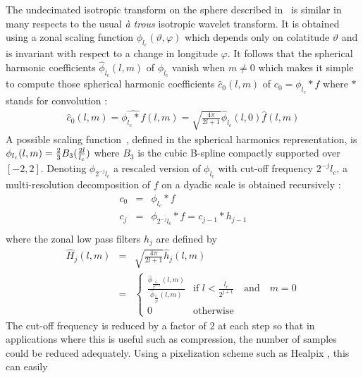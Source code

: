 The undecimated isotropic transform on the sphere described in~\cite{starck:sta05_2} is similar in many respects to the usual 
\emph{ \`a trous} isotropic wavelet transform. It is obtained using a zonal scaling function $\phi_{l_c}(\vartheta, \varphi)$ 
which depends only on colatitude $\vartheta$ and is invariant with respect to a change in longitude $\varphi$. It follows that 
the spherical harmonic coefficients $\hat \phi_{l_c} (l,m)$ of $\phi_{l_c}$ vanish when $m \ne 0$ which makes it simple to compute 
those spherical harmonic coefficients $\hat c_{0}(l,m)$ of $c_0 = \phi_{l_c} * f$ where $*$ stands for convolution :
\begin{eqnarray}
 \hat c_{0}(l,m) = \widehat{\phi_{l_c} * f} (l,m) = \sqrt{\frac{4\pi}{2l+1} } \hat \phi_{l_c} (l,0) \hat f(l,m) 
\end{eqnarray}
A possible scaling function~\cite{starck:book98}, defined in the spherical harmonics representation, is $\phi_{l_c}(l, m) = {2 \over 3} B_{3} ( { {2 l} \over {l_{c} } } )$ 
where $B_{3}$ is the cubic B-spline compactly supported over $[-2, 2]$. Denoting $\phi_{2^{-j} l_{c} }$ a rescaled version of 
$\phi_{l_{c}}$ with cut-off frequency $2^{-j} l_{c}$, a multi-resolution decomposition of $f$ on a dyadic scale is obtained recursively : 
\begin{eqnarray}
c_0   & = &  \phi_{ l_{c} }  * f    \nonumber    \\
c_j    &=&   \phi_{2^{-j}  l_{c}  }  * f  =   c_{j-1} * h_{j-1} \nonumber    \\
\end{eqnarray}
where the zonal low pass filters $h_{j}$ are defined by 
\begin{eqnarray}
 \hat{H}_{j}(l,m)  & =  &  \sqrt{\frac{4\pi}{2l+1} }  \hat h_{j}(l,m)  \nonumber \\
 &  =  & \left\{
  \begin{array}{ll}
  \frac {   \hat \phi_{\frac{l_{c}}{2^{j+1}} }(l,m)   }   {  \hat  \phi_{  \frac{l_{c}}{2^{j}} }(l,m)   } & \mbox{if }  l  < \frac{ l_{c}} {2^{j+1}} \quad \textrm{and}\quad m = 0\\
0 & \mbox{otherwise } \ 
  \end{array}
  \right.
\end{eqnarray}
The cut-off frequency is reduced by a factor of $2$ at each step so that in applications where this is useful such as compression, 
the number of samples could be reduced adequately. Using a pixelization scheme such as Healpix \cite{pixel:healpix}, this can easily 
